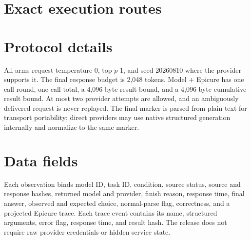 \documentclass{article}
\begin{document}
\section{Exact execution routes}
\label{app:routes}

\begin{table}[h!]
  \centering
  \resizebox{\columnwidth}{!}{%
  }
  \caption{All 20 model routes in the released leaderboard. Routes are selected before generation;
  automatic fallback is disabled.}
  \label{tab:routes}
\end{table}

\section{Protocol details}

All arms request temperature 0, top-$p$ 1, and seed 20260810 where the provider supports it. The
final response budget is 2,048 tokens. Model + Epicure has one call round, one call total, a
4,096-byte result bound, and a 4,096-byte cumulative result bound. At most two provider attempts
are allowed, and an ambiguously delivered request is never replayed. The final marker is parsed
from plain text for transport portability; direct providers may use native structured generation
internally and normalize to the same marker.

\section{Data fields}

Each observation binds model ID, task ID, condition, source status, source and response hashes,
returned model and provider, finish reason, response time, final answer, observed and expected
choice, normal-parse flag, correctness, and a projected Epicure trace. Each trace event contains its
name, structured arguments, error flag, response time, and result hash. The release does not require
raw provider credentials or hidden service state.


\clearpage
\label{references-start}
{\small


}

\clearpage

\end{document}
